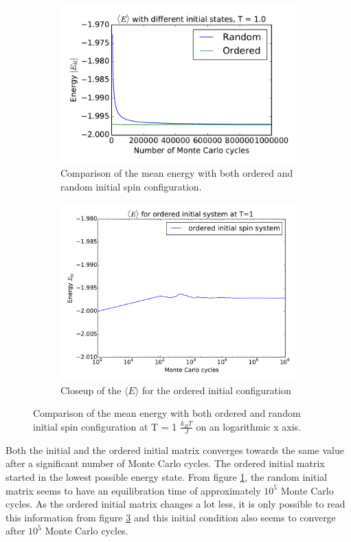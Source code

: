 \begin{figure}[H]
	\begin{subfigure}[b]{0.49\textwidth}
	\includegraphics[width=1\linewidth]{../results/4c/ran_order_T1}
\caption{Comparison of the mean energy with both ordered and random initial spin configuration.}
\label{fig:ranordert1}
	\end{subfigure}
	\hfill
	\begin{subfigure}[b]{0.49\textwidth}
	\includegraphics[width=1\linewidth]{../results/4c/order_T1_start}
\caption{Closeup of the $\langle E \rangle $ for the ordered initial configuration}
\label{fig:ordert1start}
	\end{subfigure}
	\caption{Comparison of the mean energy with both ordered and random initial spin configuration at T = 1 $\frac{k_BT}{J}  $ on an logarithmic x axis.}
\end{figure}
Both the initial and the ordered initial matrix converges towards the same value after a significant number of Monte Carlo cycles.  The ordered initial matrix started in the lowest possible energy state. From figure \ref{fig:ranordert1}, the random initial matrix seems to have an equilibration time of approximately $ 10^{5} $ Monte Carlo cycles. As the ordered initial matrix changes a lot less, it is only possible to read this information from figure \ref{fig:ordert1start} and this initial condition also seems to converge after  $ 10^{5} $ Monte Carlo cycles. 

